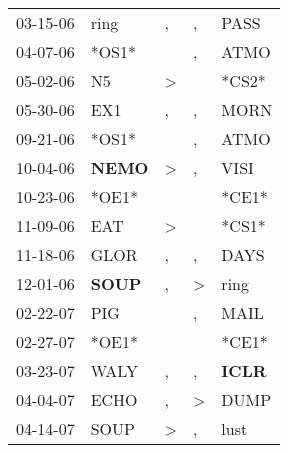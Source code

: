 \begin{supertabular}{p{0.07\textwidth}p{0.06\textwidth}p{0.02\textwidth}p{0.02\textwidth}p{0.06\textwidth}}
          03-15-06\textsuperscript{} &           ring\textsuperscript{} &                , &             , &           PASS\textsuperscript{} \\
          04-07-06\textsuperscript{} &                            *OS1* &                  &             , &           ATMO\textsuperscript{} \\
          05-02-06\textsuperscript{} &             N5\textsuperscript{} &     \textgreater &               &                            *CS2* \\
          05-30-06\textsuperscript{} &            EX1\textsuperscript{} &                , &             , &           MORN\textsuperscript{} \\
          09-21-06\textsuperscript{} &                            *OS1* &                  &             , &           ATMO\textsuperscript{} \\
          10-04-06\textsuperscript{} &  \textbf{NEMO\textsuperscript{}} &     \textgreater &             , &           VISI\textsuperscript{} \\
          10-23-06\textsuperscript{} &                            *OE1* &                  &               &                            *CE1* \\
          11-09-06\textsuperscript{} &            EAT\textsuperscript{} &     \textgreater &               &                            *CS1* \\
          11-18-06\textsuperscript{} &           GLOR\textsuperscript{} &                , &             , &           DAYS\textsuperscript{} \\
          12-01-06\textsuperscript{} &  \textbf{SOUP\textsuperscript{}} &                , &  \textgreater &           ring\textsuperscript{} \\
          02-22-07\textsuperscript{} &            PIG\textsuperscript{} &                  &             , &           MAIL\textsuperscript{} \\
          02-27-07\textsuperscript{} &                            *OE1* &                  &               &                            *CE1* \\
          03-23-07\textsuperscript{} &           WALY\textsuperscript{} &                , &             , &  \textbf{ICLR\textsuperscript{}} \\
          04-04-07\textsuperscript{} &           ECHO\textsuperscript{} &                , &  \textgreater &           DUMP\textsuperscript{} \\
          04-14-07\textsuperscript{} &           SOUP\textsuperscript{} &     \textgreater &             , &           lust\textsuperscript{} \\

\end{supertabular}
